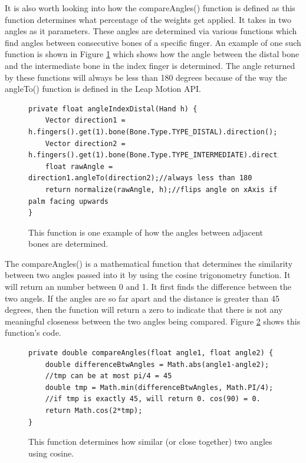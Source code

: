 It is also worth looking into how the compareAngles() function is defined as this function determines what percentage of the weights get applied. It takes in two angles as it parameters. These angles are determined via various functions which find angles between consecutive bones of a specific finger. An example of one such function is shown in Figure \ref{fig:angleIndexDistal} which shows how the angle between the distal bone and the intermediate bone in the index finger is determined. The angle returned by these functions will always be less than 180 degrees because of the way the angleTo() function is defined in the Leap Motion API. 
\begin{figure}[H]
\centering
\begin{lstlisting}
private float angleIndexDistal(Hand h) {
	Vector direction1 = h.fingers().get(1).bone(Bone.Type.TYPE_DISTAL).direction();
	Vector direction2 = h.fingers().get(1).bone(Bone.Type.TYPE_INTERMEDIATE).direction();
	float rawAngle = direction1.angleTo(direction2);//always less than 180
	return normalize(rawAngle, h);//flips angle on xAxis if palm facing upwards
}
\end{lstlisting}
\caption[angleIndexDistal() Function]{This function is one example of how the angles between adjacent bones are determined.}
\label{fig:angleIndexDistal}
\end{figure}

The compareAngles() is a mathematical function that determines the similarity between two angles passed into it by using the cosine trigonometry function. It will return an number between 0 and 1. It first finds the difference between the two angels. If the angles are so far apart and the distance is greater than 45 degrees, then the function will return a zero to indicate that there is not any meaningful closeness between the two angles being compared. Figure \ref{fig:compareAngles} shows this function's code. 
\begin{figure}[H]
\centering
\begin{lstlisting}
private double compareAngles(float angle1, float angle2) {
	double differenceBtwAngles = Math.abs(angle1-angle2);
	//tmp can be at most pi/4 = 45
	double tmp = Math.min(differenceBtwAngles, Math.PI/4);
	//if tmp is exactly 45, will return 0. cos(90) = 0.
	return Math.cos(2*tmp);
}
\end{lstlisting}
\caption[compareAngles() Function]{This function determines how similar (or close together) two angles using cosine.}
\label{fig:compareAngles}
\end{figure}



